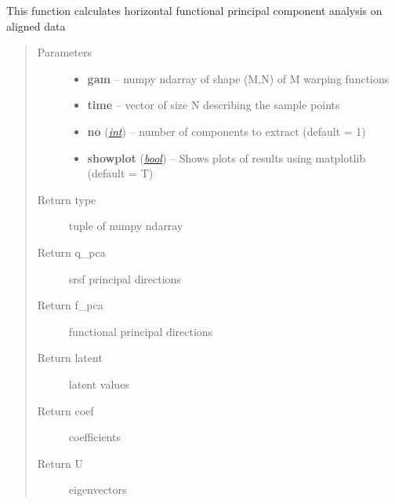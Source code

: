\documentclass[letterpaper,10pt,english]{sphinxmanual}
\begin{document}
\begin{fulllineitems}
\label{fPCA:fPCA.horizfPCA}
This function calculates horizontal functional principal component analysis on aligned data
\begin{quote}\begin{description}
\item[{Parameters}] \leavevmode\begin{itemize}
\item {} 
\textbf{gam} -- numpy ndarray of shape (M,N) of M warping functions

\item {} 
\textbf{time} -- vector of size N describing the sample points

\item {} 
\textbf{no} (\href{http://docs.python.org/library/functions.html\#int}{\emph{int}}) -- number of components to extract (default = 1)

\item {} 
\textbf{showplot} (\href{http://docs.python.org/library/functions.html\#bool}{\emph{bool}}) -- Shows plots of results using matplotlib (default = T)

\end{itemize}

\item[{Return type}] \leavevmode
tuple of numpy ndarray

\item[{Return q\_pca}] \leavevmode
srsf principal directions

\item[{Return f\_pca}] \leavevmode
functional principal directions

\item[{Return latent}] \leavevmode
latent values

\item[{Return coef}] \leavevmode
coefficients

\item[{Return U}] \leavevmode
eigenvectors

\end{description}\end{quote}

\end{fulllineitems}

\end{document}
